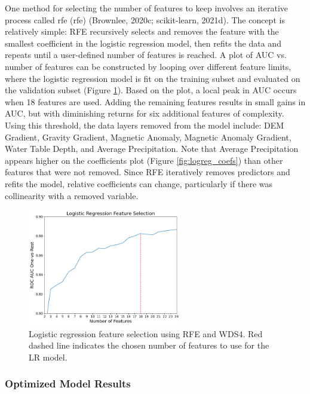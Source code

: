 One method for selecting the number of features to keep involves an iterative process called \acrlong{rfe} (\acrshort{rfe}) (Brownlee, 2020c; scikit-learn, 2021d). The concept is relatively simple: RFE recursively selects and removes the feature with the smallest coefficient in the logistic regression model, then refits the data and repeats until a user-defined number of features is reached.  A plot of AUC vs. number of features can be constructed by looping over different feature limits, where the logistic regression model is fit on the training subset and evaluated on the validation subset (Figure \ref{fig:logreg_rfe}). Based on the plot, a local peak in AUC occurs when 18 features are used. Adding the remaining features results in small gains in AUC, but with diminishing returns for six additional features of complexity. Using this threshold, the data layers removed from the model include: DEM Gradient, Gravity Gradient, Magnetic Anomaly, Magnetic Anomaly Gradient, Water Table Depth, and Average Precipitation. Note that Average Precipitation appears higher on the coefficients plot (Figure \ref{fig:logreg_coefs}) than other features that were not removed. Since RFE iteratively removes predictors and refits the model, relative coefficients can change, particularly if there was collinearity with a removed variable.

\begin{figure}[!htp]
\centering
\includegraphics[width=0.6\textwidth]{templates/images/Figure-LR_feature_selection.png}
\singlespacing
\caption[Logistic regression feature selection]{Logistic regression feature selection using RFE and WDS4. Red dashed line indicates the chosen number of features to use for the LR model.}
\label{fig:logreg_rfe}
\end{figure}
\subsubsection{Optimized Model Results}\label{ch5:logreg_results}

